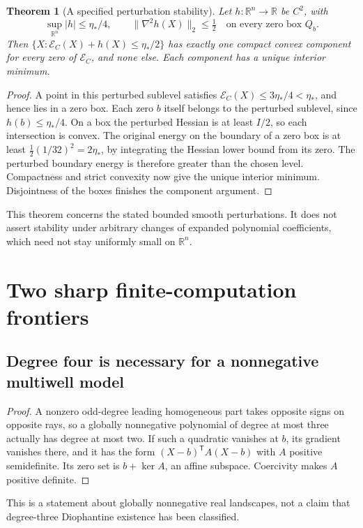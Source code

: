 \documentclass[11pt,letterpaper]{article}
\numberwithin{equation}{section}
\newtheorem{theorem}{Theorem}[section]
\newtheorem{proposition}[theorem]{Proposition}
\theoremstyle{definition}
\theoremstyle{remark}
\newcommand{\R}{\mathbb R}
\newcommand{\srcmark}[1]{\par\noindent{\small\itshape [source~#1]}\par}
\newcommand{\cE}{\mathcal E}
\newcommand{\etastar}{\eta_*}
\begin{document}
\begin{theorem}[A specified perturbation stability]\label{pqc:ql:thm:perturb}
Let $h:\R^n\to\R$ be $C^2$, with
\[
 \sup_{\R^n}|h|\le\etastar/4,
 \qquad \|\nabla^2h(X)\|_2\le\tfrac12
 \quad\text{on every zero box }Q_b.
\]
Then $\{X:\cE_C(X)+h(X)\le\etastar/2\}$ has exactly one compact convex
component for every zero of $\cE_C$, and none else. Each component has a
unique interior minimum.
\end{theorem}
\begin{proof}
A point in this perturbed sublevel satisfies
$\cE_C(X)\le3\etastar/4<\etastar$, and hence lies in a zero box. Each
zero $b$ itself belongs to the perturbed sublevel, since
$h(b)\le\etastar/4$. On a box the perturbed Hessian is at least $I/2$,
so each intersection is convex. The original energy on the boundary of
a zero box is at least $\tfrac12(1/32)^2=2\etastar$, by integrating the
Hessian lower bound from its zero. The perturbed boundary energy is
therefore greater than the chosen level. Compactness and strict convexity
now give the unique interior minimum. Disjointness of the boxes finishes
the component argument.
\end{proof}

This theorem concerns the stated bounded smooth perturbations. It does not
assert stability under arbitrary changes of expanded polynomial
coefficients, which need not stay uniformly small on $\R^n$.

\section{Two sharp finite-computation frontiers}\label{pqc:ql:sec:frontier}
\srcmark{13}

\subsection{Degree four is necessary for a nonnegative multiwell model}
\begin{proof}
A nonzero odd-degree leading homogeneous part takes opposite signs on
opposite rays, so a globally nonnegative polynomial of degree at most
three actually has degree at most two. If such a quadratic vanishes at
$b$, its gradient vanishes there, and it has the form
$(X-b)^{\mathsf T}A(X-b)$ with $A$ positive semidefinite. Its zero set is
$b+\ker A$, an affine subspace. Coercivity makes $A$ positive definite.
\end{proof}
This is a statement about globally nonnegative real landscapes, not a
claim that degree-three Diophantine existence has been classified.
\end{document}
